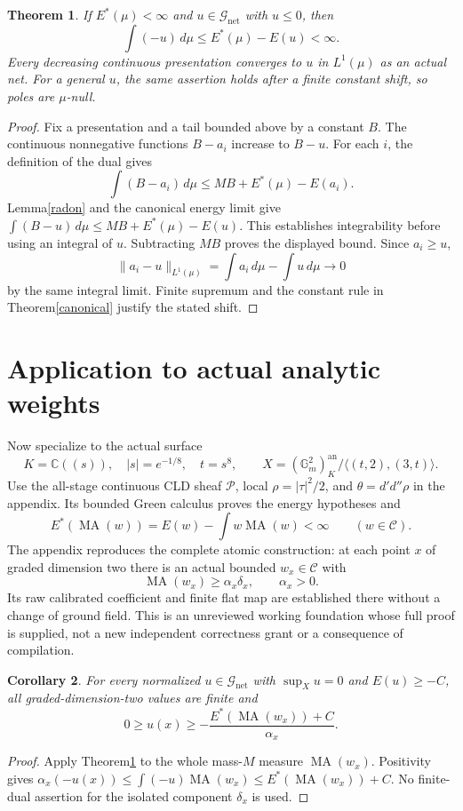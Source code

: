 \documentclass[11pt]{article}
\newcommand{\DD}{d'd''}
\newcommand{\MA}{\operatorname{MA}}
\newcommand{\C}{\mathcal C}
\newcommand{\GN}{\mathcal G_{\mathrm{net}}}
\newtheorem{theorem}{Theorem}
\newtheorem{corollary}[theorem]{Corollary}
\theoremstyle{remark}\newtheorem{remark}[theorem]{Remark}
\begin{document}
\begin{theorem}\label{dualmoment}
If $E^*(\mu)<\infty$ and $u\in\GN$ with $u\le0$, then
\[
 \int(-u)\,d\mu\le E^*(\mu)-E(u)<\infty.
\]
Every decreasing continuous presentation converges to $u$ in
$L^1(\mu)$ as an actual net. For a general $u$, the same assertion
holds after a finite constant shift, so poles are $\mu$-null.
\end{theorem}
\begin{proof}
Fix a presentation and a tail bounded above by a constant $B$.
The continuous nonnegative functions $B-a_i$ increase to $B-u$.
For each $i$, the definition of the dual gives
\[
 \int(B-a_i)\,d\mu\le MB+E^*(\mu)-E(a_i).
\]
Lemma\ref{radon} and the canonical energy limit give
$\int(B-u)\,d\mu\le MB+E^*(\mu)-E(u)$.
This establishes integrability before using an integral of $u$.
Subtracting $MB$ proves the displayed bound. Since $a_i\ge u$,
\[
 \|a_i-u\|_{L^1(\mu)}=\int a_i\,d\mu-\int u\,d\mu
 \longrightarrow0
\]
by the same integral limit. Finite supremum and the constant rule
in Theorem\ref{canonical} justify the stated shift.
\end{proof}

\section{Application to actual analytic weights}
Now specialize to the actual surface
\[
 K=\mathbb C((s)),\quad |s|=e^{-1/8},\quad t=s^8,
 \qquad X=(\mathbb G_m^2)^{\mathrm{an}}_K/
          \langle(t,2),(3,t)\rangle.
\]
Use the all-stage continuous CLD sheaf $\mathscr P$, local
$\rho=|\tau|^2/2$, and $\theta=\DD\rho$ in the appendix.
Its bounded Green calculus proves the energy hypotheses and
\[
 E^*(\MA(w))=E(w)-\int w\MA(w)<\infty\qquad(w\in\C).
\]
The appendix reproduces the complete atomic construction: at
each point $x$ of graded dimension two there is an actual bounded
$w_x\in\C$ with
\[
 \MA(w_x)\ge\alpha_x\delta_x,\qquad\alpha_x>0.
\]
Its raw calibrated coefficient and finite flat map are established
there without a change of ground field. This is an unreviewed
working foundation whose full proof is supplied, not a new
independent correctness grant or a consequence of compilation.

\begin{corollary}\label{netpoints}
For every normalized $u\in\GN$ with $\sup_Xu=0$ and
$E(u)\ge-C$, all graded-dimension-two values are finite and
\[
 0\ge u(x)\ge-
 \frac{E^*(\MA(w_x))+C}{\alpha_x}.
\]
\end{corollary}
\begin{proof}
Apply Theorem\ref{dualmoment} to the whole mass-$M$ measure
$\MA(w_x)$. Positivity gives
$\alpha_x(-u(x))\le\int(-u)\MA(w_x)\le E^*(\MA(w_x))+C$.
No finite-dual assertion for the isolated component $\delta_x$
is used.
\end{proof}
\end{document}
